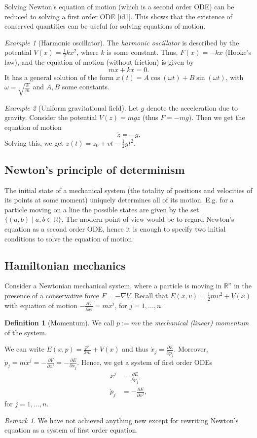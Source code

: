 \documentclass[12pt]{amsart}
\numberwithin{equation}{section}
\theoremstyle{plain}
\theoremstyle{definition}
\newtheorem{defn}{Definition}[subsection]
\theoremstyle{remark}
\newtheorem{rem}{Remark}[subsection]
\newtheorem{ex}{Example}[subsection]
\newcommand{\R}{\mathbb{R}}
\begin{document}
Solving Newton's equation of motion (which is a second order ODE) can be reduced to solving a first order ODE \eqref{id1}. This shows that the existence of conserved quantities can be useful for solving equations of motion.

\begin{ex}[Harmonic oscillator]
The \emph{harmonic oscillator} is described by the potential $V(x)=\frac{1}{2}kx^2$, where $k$ is some constant. Thus, $F(x)=-kx$ (Hooke's law), and the equation of motion (without friction) is given by 
\[
m\ddot{x}+kx=0.
\]
It has a general solution of the form $x(t)=A\cos(\omega t)+B\sin(\omega t)$, with $\omega=\sqrt{\frac{k}{m}}$ and $A,B$ some constants.
\end{ex}

\begin{ex}[Uniform gravitational field]
 Let $g$ denote the acceleration due to gravity. Consider the potential $V(z)=mgz$ (thus $F=-mg$). Then we get the equation of motion 
 \[
 \ddot{z}=-g.
\]
Solving this, we get $z(t)=z_0+vt-\frac{1}{2}gt^2$. 
\end{ex}

\subsection{Newton's principle of determinism}
The initial state of a mechanical system (the totality of positions and velocities of its points at some moment) uniquely determines all of its motion. E.g. for a particle moving on a line the possible states are given by the set $\{(a,b)\mid a,b\in\R\}$. The modern point of view would be to regard Newton's equation as a second order ODE, hence it is enough to specify two initial conditions to solve the equation of motion.

\subsection{Hamiltonian mechanics}
Consider a Newtonian mechanical system, where a particle is moving in $\R^n$ in the presence of a conservative force $F=-\nabla V$. Recall that $E(x,v)=\frac{1}{2}mv^2+V(x)$ with equation of motion $-\frac{\partial V}{\partial x^j}=m\ddot{x}^j$, for $j=1,...,n$.

\begin{defn}[Momentum]
We call $p:=mv$ the \emph{mechanical (linear) momentum} of the system.
\end{defn}

We can write $E(x,p)=\frac{p^2}{2m}+V(x)$ and thus $\dot{x}_j=\frac{\partial E}{\partial p_j}$. Moreover, $\dot{p}_j=m\ddot{x}^j=-\frac{\partial V}{\partial x^j}=-\frac{\partial E}{\partial x_j}$. Hence, we get a system of first order ODEs
\begin{align}
\dot{x}^j&=\frac{\partial E}{\partial p_j},\\
\dot{p}_j&=-\frac{\partial E}{\partial x^j},
\end{align}
for $j=1,...,n$. 
\begin{rem}
We have not achieved anything new except for rewriting Newton's equation as a system of first order equation.
\end{rem}
\end{document}
